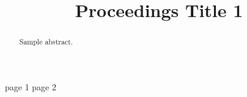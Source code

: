 \documentclass[a4paper]{IEEEtran}
\title{Proceedings Title 1}
\author{
\IEEEauthorblockN{Last1, First1}
\IEEEauthorblockA{}
\and
\IEEEauthorblockN{Last3, First3}
\IEEEauthorblockA{}
}
\begin{document}
\maketitle
\begin{abstract}
Sample abstract.
\end{abstract}
page 1
\cleardoublepage
page 2
\end{document}
